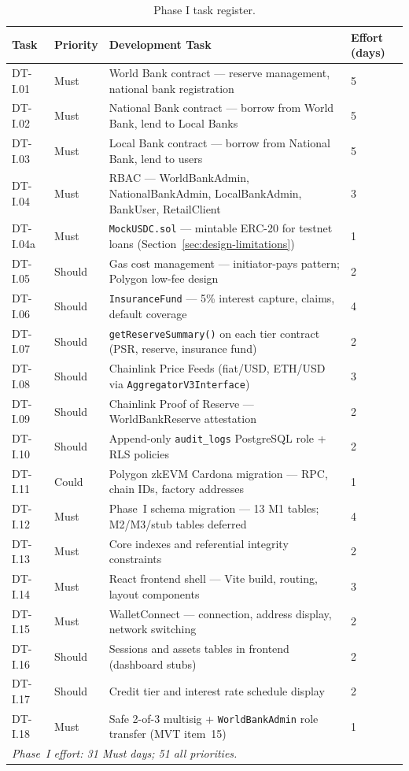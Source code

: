 \enlargethispage{1.1cm}
\begin{table}[H]
\centering
\caption[Phase I task register]{Phase I task register.}
\label{tab:phaseI-contracts}
\scriptsize
\setlength{\tabcolsep}{2.5pt}
\renewcommand{\arraystretch}{0.98}
\begin{tabular}{p{1.6cm}p{1.5cm}p{7.7cm}p{1.2cm}}
\toprule
\tableheadcolor
\textbf{Task} & \textbf{Priority} & \textbf{Development Task} & \textbf{Effort (days)} \\
\midrule
DT-I.01 & Must & World Bank contract --- reserve management, national bank registration & 5 \\
DT-I.02 & Must & National Bank contract --- borrow from World Bank, lend to Local Banks & 5 \\
DT-I.03 & Must & Local Bank contract --- borrow from National Bank, lend to users & 5 \\
DT-I.04 & Must & RBAC --- WorldBankAdmin, NationalBankAdmin, LocalBankAdmin, BankUser, RetailClient & 3 \\
DT-I.04a & Must & \texttt{MockUSDC.sol} --- mintable ERC-20 for testnet loans (Section~\ref{sec:design-limitations}) & 1 \\
DT-I.05 & Should & Gas cost management --- initiator-pays pattern; Polygon low-fee design & 2 \\
DT-I.06 & Should & \texttt{InsuranceFund} --- 5\% interest capture, claims, default coverage & 4 \\
DT-I.07 & Should & \texttt{getReserveSummary()} on each tier contract (PSR, reserve, insurance fund) & 2 \\
DT-I.08 & Should & Chainlink Price Feeds (fiat/USD, ETH/USD via \texttt{AggregatorV3Interface}) & 3 \\
DT-I.09 & Should & Chainlink Proof of Reserve --- WorldBankReserve attestation & 2 \\
DT-I.10 & Should & Append-only \texttt{audit\_logs} PostgreSQL role + RLS policies & 2 \\
DT-I.11 & Could & Polygon zkEVM Cardona migration --- RPC, chain IDs, factory addresses & 1 \\
DT-I.12 & Must & Phase~I schema migration --- 13 M1 tables; M2/M3/stub tables deferred & 4 \\
DT-I.13 & Must & Core indexes and referential integrity constraints & 2 \\
DT-I.14 & Must & React frontend shell --- Vite build, routing, layout components & 3 \\
DT-I.15 & Must & WalletConnect --- connection, address display, network switching & 2 \\
DT-I.16 & Should & Sessions and assets tables in frontend (dashboard stubs) & 2 \\
DT-I.17 & Should & Credit tier and interest rate schedule display & 2 \\
DT-I.18 & Must & Safe 2-of-3 multisig + \texttt{WorldBankAdmin} role transfer (MVT item~15) & 1 \\
\multicolumn{3}{l}{\textit{Phase~I effort: 31 Must days; 51 all priorities.}} & \\
\bottomrule
\end{tabular}
\end{table}



